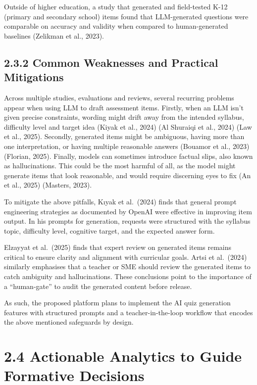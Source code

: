 \documentclass[
  12pt,
  a4paper,
]{report}
\begin{document}
Outside of higher education, a study that generated and field-tested
K-12 (primary and secondary school) items found that LLM-generated
questions were comparable on accuracy and validity when compared to
human-generated baselines (Zelikman et al., 2023).

\hypertarget{common-weaknesses-and-practical-mitigations}{%
\subsection{2.3.2 Common Weaknesses and Practical
Mitigations}\label{common-weaknesses-and-practical-mitigations}}

Across multiple studies, evaluations and reviews, several recurring
problems appear when using LLM to draft assessment items. Firstly, when
an LLM isn't given precise constraints, wording might drift away from the
intended syllabus, difficulty level and target idea (Kiyak et al., 2024)
(Al Shuraiqi et al., 2024) (Law et al., 2025). Secondly, generated items might be
ambiguous, having more than one interpretation, or having multiple
reasonable answers (Bouamor et al., 2023) (Florian, 2025). Finally,
models can sometimes introduce factual slips, also known as
hallucinations. This could be the most harmful of all, as the model
might generate items that look reasonable, and would require discerning
eyes to fix (An et al., 2025) (Masters, 2023).

To mitigate the above pitfalls, Kıyak et al.~(2024) finds that general
prompt engineering strategies as documented by OpenAI were effective in
improving item output. In his prompts for generation, requests were
structured with the syllabus topic, difficulty level, cognitive target,
and the expected answer form.

Elzayyat et al.~(2025) finds that expert review on generated items
remains critical to ensure clarity and alignment with curricular goals.
Artsi et al.~(2024) similarly emphasises that a teacher or SME should
review the generated items to catch ambiguity and hallucinations. These
conclusions point to the importance of a ``human-gate'' to audit the
generated content before release.

As such, the proposed platform plans to implement the AI quiz generation
features with structured prompts and a teacher-in-the-loop workflow that
encodes the above mentioned safeguards by design.

\hypertarget{actionable-analytics-to-guide-formative-decisions}{%
\section{2.4 Actionable Analytics to Guide Formative
Decisions}\label{actionable-analytics-to-guide-formative-decisions}}
\end{document}
